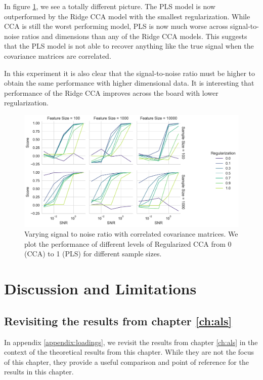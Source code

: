 In figure \ref{fig:snr-scores-random}, we see a totally different picture.
The PLS model is now outperformed by the Ridge CCA model with the smallest regularization.
While CCA is still the worst performing model, PLS is now much worse across signal-to-noise ratios and dimensions than any of the Ridge CCA models.
This suggests that the PLS model is not able to recover anything like the true signal when the covariance matrices are correlated.


In this experiment it is also clear that the signal-to-noise ratio must be higher to obtain the same performance with higher dimensional data.
It is interesting that performance of the Ridge CCA improves across the board with lower regularization.


\begin{figure}
    \centering
    \includegraphics[width=\linewidth]{figures/brain_behaviour_sim/snr_vs_scores_facet_random}
    \caption{Varying signal to noise ratio with correlated covariance matrices. We plot the performance of different levels of Regularized CCA from 0 (CCA) to 1 (PLS) for different sample sizes.}\label{fig:snr-scores-random}
\end{figure}

\section{Discussion and Limitations}

\subsection{Revisiting the results from chapter \ref{ch:als}}

In appendix \ref{appendix:loadings}, we revisit the results from chapter \ref{ch:als} in the context of the theoretical results from this chapter. While they are not the focus of this chapter, they provide a useful comparison and point of reference for the results in this chapter.

